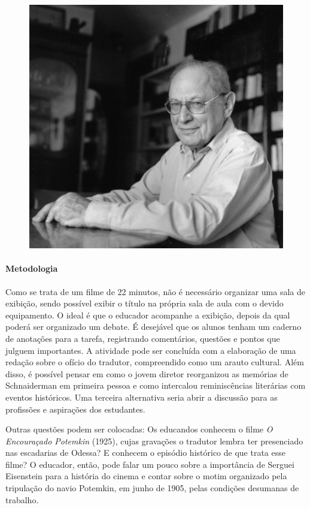 \documentclass{article}
\begin{document}
\begin{figure}[ht!]
\includegraphics[width=\textwidth]{./images/PNLD0049-14.png}
\end{figure}

\paragraph{Metodologia}
Como se trata de um filme de 22 minutos, não é necessário organizar uma
sala de exibição, sendo possível exibir o título na própria sala de aula
com o devido equipamento. O ideal é que o educador acompanhe a exibição,
depois da qual poderá ser organizado um debate. É desejável que os
alunos tenham um caderno de anotações para a tarefa, registrando
comentários, questões e pontos que julguem importantes. A atividade pode
ser concluída com a elaboração de uma redação sobre o ofício do
tradutor, compreendido como um arauto cultural. Além disso, é possível
pensar em como o jovem diretor reorganizou as memórias de Schnaiderman
em primeira pessoa e como intercalou reminiscências literárias com
eventos históricos. Uma terceira alternativa seria abrir a discussão
para as profissões e aspirações dos estudantes.

Outras questões podem ser colocadas: Os educandos conhecem o filme
\emph{O Encouraçado Potemkin} (1925), cujas gravações o tradutor lembra
ter presenciado nas escadarias de Odessa? E conhecem o episódio
histórico de que trata esse filme? O educador, então, pode falar um
pouco sobre a importância de Serguei Eisenstein para a história do
cinema e contar sobre o motim organizado pela tripulação do navio
Potemkin, em junho de 1905, pelas condições desumanas de trabalho.
\end{document}
